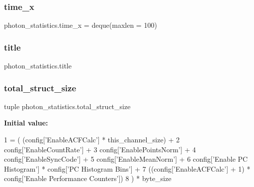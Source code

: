 \mbox{\label{namespacephoton__statistics_a718548ec119098f106f9ff9f31b409bf}} 
\subsubsection{\texorpdfstring{time\+\_\+x}{time\_x}}
{\footnotesize\ttfamily photon\+\_\+statistics.\+time\+\_\+x = deque(maxlen = 100)}

\mbox{\label{namespacephoton__statistics_a76d9f47b30df749d7d370e77849ca649}} 
\subsubsection{\texorpdfstring{title}{title}}
{\footnotesize\ttfamily photon\+\_\+statistics.\+title}

\mbox{\label{namespacephoton__statistics_a5b69b2191de100464a5ebcc9ebe30017}} 
\subsubsection{\texorpdfstring{total\+\_\+struct\+\_\+size}{total\_struct\_size}}
{\footnotesize\ttfamily tuple photon\+\_\+statistics.\+total\+\_\+struct\+\_\+size}

{\bfseries Initial value\+:}
\begin{DoxyCode}
1 =  (    (config[\textcolor{stringliteral}{'EnableACFCalc'}] * this\_channel\_size) + 
2                         config[\textcolor{stringliteral}{'EnableCountRate'}] +
3                         config[\textcolor{stringliteral}{'EnablePointsNorm'}] +
4                         config[\textcolor{stringliteral}{'EnableSyncCode'}] +
5                         config[\textcolor{stringliteral}{'EnableMeanNorm'}] + 
6                         config[\textcolor{stringliteral}{'Enable PC Histogram'}] * config[\textcolor{stringliteral}{'PC Histogram Bins'}] +
7                         ((config[\textcolor{stringliteral}{'EnableACFCalc'}] + 1) * config[\textcolor{stringliteral}{'Enable Performance Counters'}])
8                     ) * byte\_size
\end{DoxyCode}
\mbox{\label{namespacephoton__statistics_aa0ea01ea8f5c4844ed6c10dbe51d0497}} 
